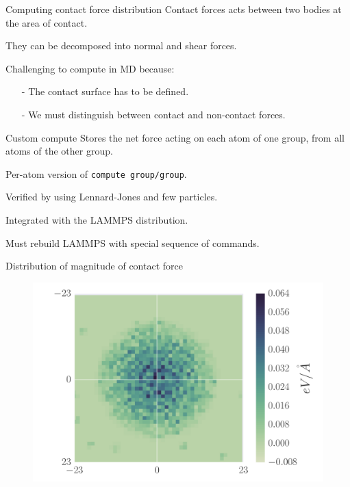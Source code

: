 \documentclass{beamer}
\begin{document}
\begin{frame}[t]{Computing contact force distribution}
	Contact forces acts between two bodies at the area of contact. 
	
	They can be decomposed into normal and shear forces.
	
	Challenging to compute in MD because:
	\begin{itemize}
		\item[-] The contact surface has to be defined.
		\item[-] We must distinguish between contact and non-contact forces.
	\end{itemize}
	
\end{frame}


\begin{frame}[t]{Custom compute}
	Stores the net force acting on each atom of one group, from all atoms of the other group.
	
	Per-atom version of \texttt{compute group/group}.
	
	Verified by using Lennard-Jones and few particles. 
	
	Integrated with the LAMMPS distribution.
	
	Must rebuild LAMMPS with special sequence of commands. 
\end{frame}

{
\begin{frame}{Distribution of magnitude of contact force}
	\centering
	\begin{figure}
			\includegraphics[width=0.8\linewidth,  trim={15mm 2mm 7mm 2mm}, clip]{figures/forceDistribution/forces/absoluteForceDistribution.pdf}
	\end{figure}
\end{frame}
}
\end{document}
